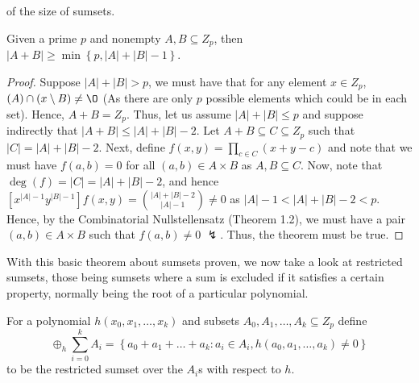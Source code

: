 of the size of sumsets.\ \begin{theorem} Given a
	prime $p$ and nonempty $A,B \subseteq Z_{p}$, then $\left| A + B
	\right| \ge \min \left\{ p, \left| A \right|  + \left| B \right|  -1
	\right\} $.  \end{theorem} \begin{proof}[Proof] Suppose $\left| A
	\right| + \left| B \right| > p$, we must have that for any element $x
	\in Z_p$, $\left( A \right) \cap \left( x \setminus B \right) \neq \O$
	(As there are only $p$ possible elements which could be in each set).
	Hence, $A + B = Z_p$. Thus, let us assume $\left| A \right|  + \left| B
	\right| \le p$ and suppose indirectly that $\left| A+B \right| \le
	\left| A \right| + \left| B \right| -2$. Let $A+B \subseteq C \subseteq
	Z_p$ such that $\left| C \right| = \left| A \right|  + \left| B \right|
	-2$. Next, define $f\left( x,y \right)  = \prod_{c \in C}^{} \left( x +
	y - c \right) $ and note that we must have $f\left( a,b \right)  = 0$
	for all $\left( a,b \right)  \in A \times B$ as $A,B \subseteq C$. Now, note
	that $\deg \left( f \right) = \left| C \right| = \left| A \right|  +
	\left| B \right|  -2$, and hence $[x^{\left| A \right| -1}y ^{\left| B
	\right| -1}]f\left( x,y \right) = \binom{\left| A \right| + \left| B
\right|  -2}{\left| A \right| -1} \neq 0$ as $\left| A \right| -1 < \left| A
\right|  + \left| B \right| -2 < p$. Hence, by the Combinatorial
Nullstellensatz (Theorem 1.2), we must have a pair $\left( a,b \right)  \in A
\times B$ such that $f\left( a,b \right) \neq 0$ $\lightning$. Thus, the theorem must be true.
\end{proof} With this basic theorem about
sumsets proven, we now take a look at restricted sumsets, those being sumsets
where a sum is excluded if it satisfies a certain property, normally being the
root of a particular polynomial.  \begin{notation} For a
	polynomial $h \left( x_0, x_1, \ldots, x_{k} \right) $ and subsets
	$A_0, A_1, \ldots, A_{k} \subseteq Z_p$ define \[ \oplus _h
	\sum_{i=0}^{k} A_{i} = \left\{ a_0 + a_1 + \ldots + a_{k} : a_{i} \in
A_{i}, h\left( a_0, a_1, \ldots, a_{k} \right) \neq 0 \right\} \] to be the
restricted sumset over the $A_{i}$s with respect to $h$.  \end{notation}
